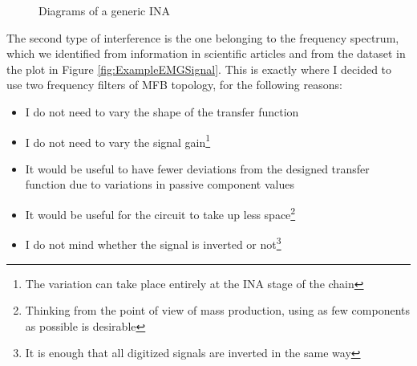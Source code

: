 \documentclass[a4paper, 10pt, final]{article} %
\begin{document}
\begin{figure}[H]
\begin{minipage}[H]{.64\linewidth}
            \label{fig:INAInternalSchematic}
        \end{minipage}
        \hspace{.04\linewidth}
        \caption{Diagrams of a generic INA}
        \label{fig:INASchematic}
    \end{figure}

    The second type of interference is the one belonging to the frequency spectrum, which we identified from information in scientific articles and from the dataset in the plot in Figure \ref{fig:ExampleEMGSignal}.
    This is exactly where I decided to use two frequency filters of MFB topology, for the following reasons:
    \begin{itemize}
        \item I do not need to vary the shape of the transfer function
        \item I do not need to vary the signal gain\footnote{The variation can take place entirely at the INA stage of the chain}
        \item It would be useful to have fewer deviations from the designed transfer function due to variations in passive component values
        \item It would be useful for the circuit to take up less space\footnote{Thinking from the point of view of mass production, using as few components as possible is desirable}
        \item I do not mind whether the signal is inverted or not\footnote{It is enough that all digitized signals are inverted in the same way}
    \end{itemize}
    
\end{document}
